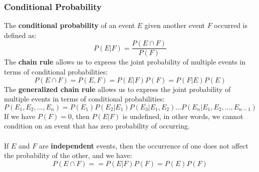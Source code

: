 \subsubsection{Conditional Probability}
The \textbf{conditional probability} of an event $E$ given another event $F$ occurred is defined as:
\begin{equation}
    P(E|F) = \frac{P(E \cap F)}{P(F)}
\end{equation}
The \textbf{chain rule} allows us to express the joint probability of multiple events in terms of conditional probabilities:
\begin{equation}
    P(E \cap F) = P (E,F) = P(E|F) P(F) = P(F|E) P(E)
\end{equation}
The \textbf{generalized chain rule} allows us to express the joint probability of multiple events in terms of conditional probabilities:
\begin{equation}
    P(E_1, E_2, ..., E_n) = P(E_1) P(E_2|E_1) P(E_3|E_1, E_2) ... P(E_n|E_1, E_2, ..., E_{n-1})
\end{equation}
If we have $P(F)=0$, then $P(E|F)$ is undefined, in other words, we cannot condition on an event that has zero probability of occurring.
\\\\
If $E$ and $F$ are \textbf{independent} events, then the occurrence of one does not affect the probability of the other, and we have:
\begin{equation}
    P(E \cap F) = = P(E|F)P(F) = P(E)P(F) 
\end{equation}

